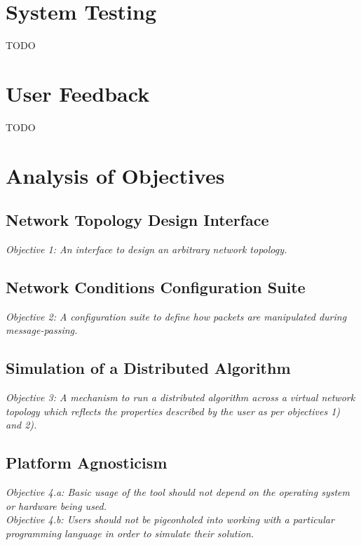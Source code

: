 \section{System Testing}\label{section:system_testing}

TODO


\section{User Feedback}\label{section:user_feedback}

TODO


\section{Analysis of Objectives}\label{section:analysis_of_objectives}

\subsection{Network Topology Design Interface}\label{subsection:network_topology_design_interface}

\emph{Objective 1: An interface to design an arbitrary network topology.}

\subsection{Network Conditions Configuration Suite}\label{subsection:network_conditions_configuration_suite }

\emph{Objective 2: A configuration suite to define how packets are manipulated during message-passing.}

\subsection{Simulation of a Distributed Algorithm}\label{subsection:simulation_of_a_distributed_algorithm}

\emph{Objective 3: A mechanism to run a distributed algorithm across a virtual network topology which reflects the
properties described by the user as per objectives 1) and 2).}

\subsection{Platform Agnosticism}\label{subsection:platform_agnosticism}

\emph{Objective 4.a: Basic usage of the tool should not depend on the operating system or hardware being used.} \\
\emph{Objective 4.b: Users should not be pigeonholed into working with a particular programming language in order to
simulate their solution.}

